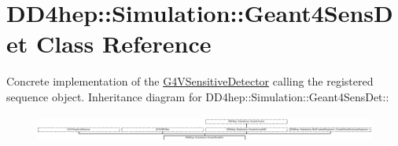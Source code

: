 \hypertarget{class_d_d4hep_1_1_simulation_1_1_geant4_sens_det}{
\section{DD4hep::Simulation::Geant4SensDet Class Reference}
\label{class_d_d4hep_1_1_simulation_1_1_geant4_sens_det}
}


Concrete implementation of the \hyperlink{class_g4_v_sensitive_detector}{G4VSensitiveDetector} calling the registered sequence object.  
Inheritance diagram for DD4hep::Simulation::Geant4SensDet::\begin{figure}[H]
\begin{center}
\leavevmode
\includegraphics[height=0.913043cm]{class_d_d4hep_1_1_simulation_1_1_geant4_sens_det}
\end{center}
\end{figure}
